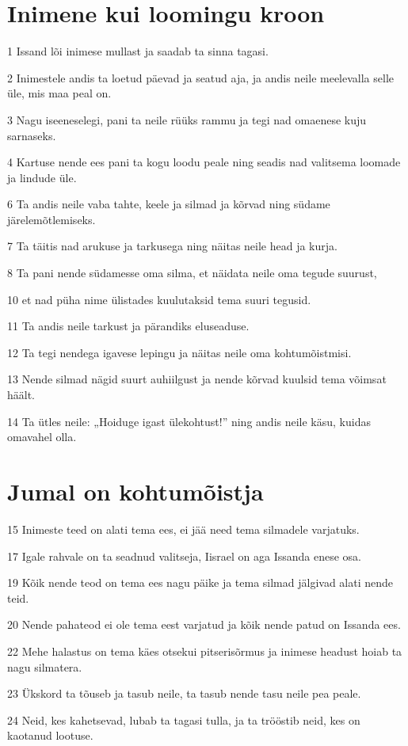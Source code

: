 \section*{Inimene kui loomingu kroon}

\par 1 Issand lõi inimese mullast ja saadab ta sinna tagasi.
\par 2 Inimestele andis ta loetud päevad ja seatud aja, ja andis neile meelevalla selle üle, mis maa peal on.
\par 3 Nagu iseeneselegi, pani ta neile rüüks rammu ja tegi nad omaenese kuju sarnaseks.
\par 4 Kartuse nende ees pani ta kogu loodu peale ning seadis nad valitsema loomade ja lindude üle.
\par 6 Ta andis neile vaba tahte, keele ja silmad ja kõrvad ning südame järelemõtlemiseks.
\par 7 Ta täitis nad arukuse ja tarkusega ning näitas neile head ja kurja.
\par 8 Ta pani nende südamesse oma silma, et näidata neile oma tegude suurust,
\par 10 et nad püha nime ülistades kuulutaksid tema suuri tegusid.
\par 11 Ta andis neile tarkust ja pärandiks eluseaduse.
\par 12 Ta tegi nendega igavese lepingu ja näitas neile oma kohtumõistmisi.
\par 13 Nende silmad nägid suurt auhiilgust ja nende kõrvad kuulsid tema võimsat häält.
\par 14 Ta ütles neile: „Hoiduge igast ülekohtust!” ning andis neile käsu, kuidas omavahel olla.

\section*{Jumal on kohtumõistja}

\par 15 Inimeste teed on alati tema ees, ei jää need tema silmadele varjatuks.
\par 17 Igale rahvale on ta seadnud valitseja, Iisrael on aga Issanda enese osa.
\par 19 Kõik nende teod on tema ees nagu päike ja tema silmad jälgivad alati nende teid.
\par 20 Nende pahateod ei ole tema eest varjatud ja kõik nende patud on Issanda ees.
\par 22 Mehe halastus on tema käes otsekui pitserisõrmus ja inimese headust hoiab ta nagu silmatera.
\par 23 Ükskord ta tõuseb ja tasub neile, ta tasub nende tasu neile pea peale.
\par 24 Neid, kes kahetsevad, lubab ta tagasi tulla, ja ta trööstib neid, kes on kaotanud lootuse.

